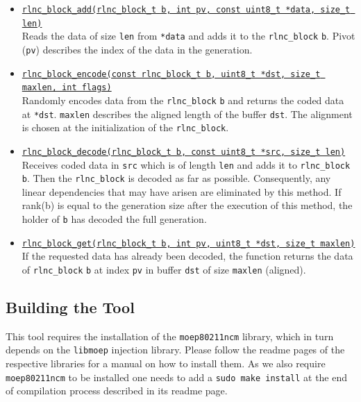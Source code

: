 \documentclass[a4paper,english,10pt]{tumarticle}
\begin{document}
\begin{itemize}
    \item \underline{\texttt{rlnc\_block\_add(rlnc\_block\_t b, int pv, const uint8\_t *data,
    size\_t len)}}\\
    Reads the data of size \texttt{len} from \texttt{*data} and adds it to the \texttt{rlnc\_block}
    \texttt{b}. Pivot (\texttt{pv}) describes the index of the data in the generation.

    \item \underline{\texttt{rlnc\_block\_encode(const rlnc\_block\_t b, uint8\_t *dst, size\_t
    maxlen, int flags)}}\\
    Randomly encodes data from the \texttt{rlnc\_block} \texttt{b} and returns the coded data at \texttt{*dst}. 
    \texttt{maxlen} describes the aligned length of the buffer \texttt{dst}. The alignment is chosen at the initialization of the \texttt{rlnc\_block}.
    
    \item \underline{\texttt{rlnc\_block\_decode(rlnc\_block\_t b, const uint8\_t *src, size\_t
    len)}}\\
    Receives coded data in \texttt{src} which is of length \texttt{len} and adds it to
    \texttt{rlnc\_block} \texttt{b}. Then the \texttt{rlnc\_block} is decoded as far as possible.
    Consequently, any linear dependencies that may have arisen are eliminated by this method. If
    rank(b) is equal to the generation size after the execution of this method, the holder of
    \texttt{b} has decoded the full generation.

    \item \underline{\texttt{rlnc\_block\_get(rlnc\_block\_t b, int pv, uint8\_t *dst, size\_t
    maxlen)}}\\
    If the requested data has already been decoded, the function returns the data of
    \texttt{rlnc\_block} \texttt{b} at index \texttt{pv} in buffer \texttt{dst} of size
    \texttt{maxlen} (aligned).
  \end{itemize}

\subsection{Building the Tool}\label{app:build} This tool requires the installation of the
\texttt{moep80211ncm} library, which in turn depends on the \texttt{libmoep} injection library.
Please follow the readme pages of the respective libraries for a manual on how to install them. As
we also require \texttt{moep80211ncm} to be installed one needs to add a
\texttt{sudo make install}
at the end of compilation process described in its readme page.\\
\end{document}
